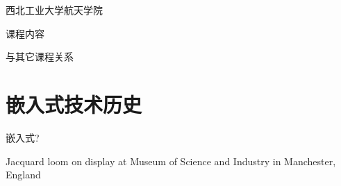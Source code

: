 

\def\lecturename{嵌入式技术}

\title{\insertlecture}

\author{邢超}

\institute
{
  西北工业大学航天学院
}


\subtitle{介绍嵌入式系统}
\date{2014}



\begin{frame}
  \maketitle
\end{frame}

\begin{frame}{课程内容}
\begin{center}\end{center}
\end{frame}

\begin{frame}{与其它课程关系}
\begin{center}\end{center}
\end{frame}



\section{嵌入式技术历史}

\begin{frame}{嵌入式?}
\begin{center}\end{center}
Jacquard loom on display at Museum of Science and Industry in Manchester, England
\end{frame}

